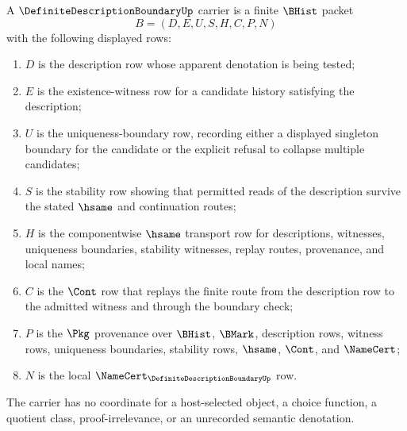 \begin{definition}
\label{def:definite-description-boundary-carrier}
A $\DefiniteDescriptionBoundaryUp$ carrier is a finite $\BHist$ packet
$$
B=(D,E,U,S,H,C,P,N)
$$
with the following displayed rows:
\begin{enumerate}
\item $D$ is the description row whose apparent denotation is being tested;
\item $E$ is the existence-witness row for a candidate history satisfying the description;
\item $U$ is the uniqueness-boundary row, recording either a displayed singleton boundary for the candidate or the explicit refusal to collapse multiple candidates;
\item $S$ is the stability row showing that permitted reads of the description survive the stated $\hsame$ and continuation routes;
\item $H$ is the componentwise $\hsame$ transport row for descriptions, witnesses, uniqueness boundaries, stability witnesses, replay routes, provenance, and local names;
\item $C$ is the $\Cont$ row that replays the finite route from the description row to the admitted witness and through the boundary check;
\item $P$ is the $\Pkg$ provenance over $\BHist$, $\BMark$, description rows, witness rows, uniqueness boundaries, stability rows, $\hsame$, $\Cont$, and $\NameCert$;
\item $N$ is the local $\NameCert_{\DefiniteDescriptionBoundaryUp}$ row.
\end{enumerate}
The carrier has no coordinate for a host-selected object, a choice function, a quotient class, proof-irrelevance, or an unrecorded semantic denotation.
\end{definition}

